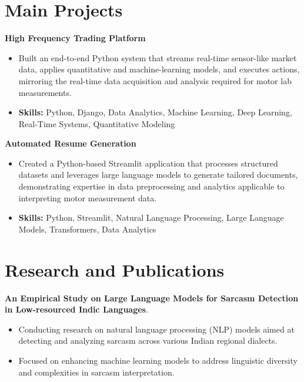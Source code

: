 \documentclass[a4paper,11pt]{article}
\begin{document}
\section{\textbf{Main Projects}}

\vspace{1mm}
  \textbf{High Frequency Trading Platform  }
\vspace{-1.5mm} %
\begin{itemize}
  \item Built an end-to-end Python system that streams real-time sensor-like market data, applies quantitative and machine-learning models, and executes actions, mirroring the real-time data acquisition and analysis required for motor lab measurements.
\vspace{-3mm}
  \item \textbf{Skills:} Python, Django, Data Analytics, Machine Learning, Deep Learning, Real-Time Systems, Quantitative Modeling
\end{itemize}


\vspace{1mm}
   \textbf{Automated Resume Generation }
\vspace{-1.5mm} %
\begin{itemize}
  \item Created a Python-based Streamlit application that processes structured datasets and leverages large language models to generate tailored documents, demonstrating expertise in data preprocessing and analytics applicable to interpreting motor measurement data.
\vspace{-3mm}
  \item \textbf{Skills:} Python, Streamlit, Natural Language Processing, Large Language Models, Transformers, Data Analytics
\end{itemize}



\section{\textbf{Research and Publications} \hfill }
\vspace{1mm}
  \textbf{An Empirical Study on Large Language Models for Sarcasm Detection in Low-resourced Indic Languages}.
\vspace{-1mm} %
\begin{itemize}
  \item Conducting research on natural language processing (NLP) models aimed at detecting and analyzing sarcasm across various Indian regional dialects.
\vspace{-3mm}
  \item Focused on enhancing machine learning models to address linguistic diversity and complexities in sarcasm interpretation.
\end{itemize}
\end{document}
